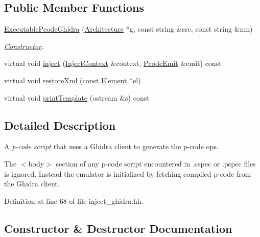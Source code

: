 \subsection*{Public Member Functions}
\begin{DoxyCompactItemize}
\item 
\mbox{\hyperlink{class_executable_pcode_ghidra_a07e851fbbb950eed2b1d3005e0cedeef}{Executable\+Pcode\+Ghidra}} (\mbox{\hyperlink{class_architecture}{Architecture}} $\ast$g, const string \&src, const string \&nm)
\begin{DoxyCompactList}\small\item\em \mbox{\hyperlink{class_constructor}{Constructor}}. \end{DoxyCompactList}\item 
virtual void \mbox{\hyperlink{class_executable_pcode_ghidra_a51caea71fd7a73b67c1d6e36754ad2a7}{inject}} (\mbox{\hyperlink{class_inject_context}{Inject\+Context}} \&context, \mbox{\hyperlink{class_pcode_emit}{Pcode\+Emit}} \&emit) const
\item 
virtual void \mbox{\hyperlink{class_executable_pcode_ghidra_a428bdbe98c4d715c72100ed91d2035c8}{restore\+Xml}} (const \mbox{\hyperlink{class_element}{Element}} $\ast$el)
\item 
virtual void \mbox{\hyperlink{class_executable_pcode_ghidra_a3bd44f4e622300a02e80b482cb31c3ea}{print\+Template}} (ostream \&s) const
\end{DoxyCompactItemize}


\subsection{Detailed Description}
A {\itshape p-\/code} {\itshape script} that uses a Ghidra client to generate the p-\/code ops. 

The $<$body$>$ section of any p-\/code script encountered in .cspec or .pspec files is ignored. Instead the emulator is initialized by fetching compiled p-\/code from the Ghidra client. 

Definition at line 68 of file inject\+\_\+ghidra.\+hh.



\subsection{Constructor \& Destructor Documentation}
\mbox{\label{class_executable_pcode_ghidra_a07e851fbbb950eed2b1d3005e0cedeef}} 
